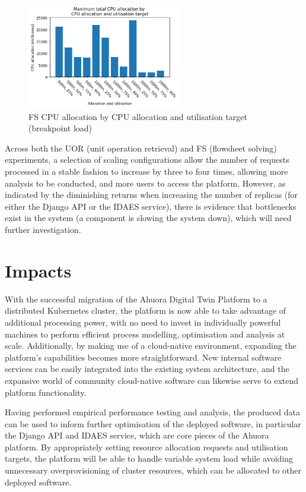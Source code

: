 \begin{figure}[H]
    \centering
    \includegraphics[width=0.6\textwidth]{figures/fs-rau-cpu-allocation-breakpoint.png}
    \caption{FS CPU allocation by CPU allocation and utilisation target (breakpoint load)}
    \label{figure:fs-rau-cpu-allocation-breakpoint}
\end{figure}

\noindent Across both the UOR (unit operation retrieval) and FS (flowsheet solving) experiments, a selection of scaling configurations allow the number of requests processed in a stable fashion to increase by three to four times, allowing more analysis to be conducted, and more users to access the platform. However, as indicated by the diminishing returns when increasing the number of replicas (for either the Django API or the IDAES service), there is evidence that bottlenecks exist in the system (a component is slowing the system down), which will need further investigation.

\section{Impacts}

With the successful migration of the Ahuora Digital Twin Platform to a distributed Kubernetes cluster, the platform is now able to take advantage of additional processing power, with no need to invest in individually powerful machines to perform efficient process modelling, optimisation and analysis at scale. Additionally, by making use of a cloud-native environment, expanding the platform's capabilities becomes more straightforward. New internal software services can be easily integrated into the existing system architecture, and the expansive world of community cloud-native software can likewise serve to extend platform functionality.

Having performed empirical performance testing and analysis, the produced data can be used to inform further optimisation of the deployed software, in particular the Django API and IDAES service, which are core pieces of the Ahuora platform. By appropriately setting resource allocation requests and utilisation targets, the platform will be able to handle variable system load while avoiding unnecessary overprovisioning of cluster resources, which can be allocated to other deployed software.

